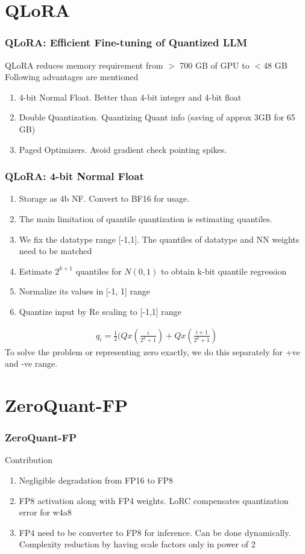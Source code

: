 \documentclass{beamer}
\theoremstyle{plain}
\theoremstyle{definition}
\theoremstyle{remark}
\numberwithin{equation}{section}
\numberwithin{figure}{section}
\numberwithin{theorem}{section}
\begin{document}
\section{QLoRA}
\begin{frame}
\frametitle{QLoRA: Efficient Fine-tuning of Quantized LLM}
QLoRA reduces memory requirement from $>$ 700 GB of GPU to $<$48 GB
Following advantages are mentioned
\begin{enumerate}
    \item 4-bit Normal Float. Better than 4-bit integer and 4-bit float
    \item Double Quantization. Quantizing Quant info (saving of approx 3GB for 65 GB)
    \item Paged Optimizers. Avoid gradient check pointing spikes.
\end{enumerate}
\end{frame}

\begin{frame}[shrink]
    \frametitle{QLoRA: 4-bit Normal Float}
    \begin{enumerate}
        \item Storage as 4b NF. Convert to BF16 for usage.
        \item The main limitation of quantile quantization is estimating quantiles.
        \item We fix the datatype range [-1,1]. The quantiles of datatype and NN weights need to be matched
        \item Estimate $2^{k+1}$ quantiles for $N(0,1)$ to obtain k-bit quantile regression
        \item Normalize its values in [-1, 1] range
        \item Quantize input by Re scaling to [-1,1] range
    \end{enumerate}                        

    \begin{align}
        q_i = \frac{1}{2} (Qx(\frac{i}{2^k+1}) + Qx(\frac{i+1}{2^k+1})    
    \end{align}
    To solve the problem or representing zero exactly, we do this separately for +ve and -ve range.
\end{frame}                        


\section{ZeroQuant-FP}
\begin{frame}
\frametitle{ZeroQuant-FP}
Contribution
\begin{enumerate}
    \item Negligible degradation from FP16 to FP8
    \item FP8 activation along with FP4 weights. LoRC compensates quantization error for w4a8
    \item FP4 need to be converter to FP8 for inference. Can be done dynamically. Complexity reduction by having scale factors only in power of 2
\end{enumerate}
\end{frame}
\end{document}
